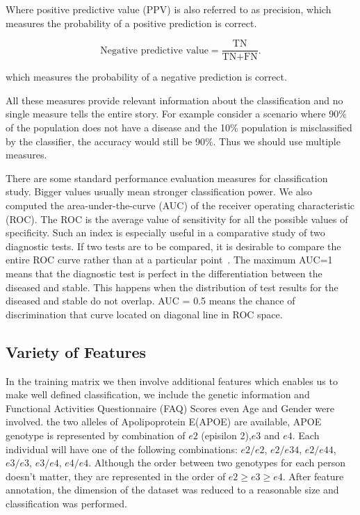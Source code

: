 \documentclass[authoryear,preprint,revi	ew,12pt]{elsarticle}
\begin{document}
Where positive predictive value (PPV) is also referred to as precision, which measures the probability of a positive prediction is correct.

\begin{equation*}
\textrm{Negative predictive value} = \frac{\textrm{TN}}{\textrm{TN} + \textrm{FN}}.
\end{equation*}

which measures the probability of a negative prediction is correct.

All these measures provide relevant information about the classification and no single measure tells the entire story. For example consider a scenario where 90\% of the population does not have a disease and the 10\% population is misclassified by the classifier, the accuracy would still be 90\%. Thus we should use multiple measures.   

There are some standard performance evaluation measures for classification study. Bigger values usually mean stronger classification power. We also computed the area-under-the-curve (AUC) of the receiver operating characteristic (ROC). The ROC is the average value of sensitivity for all the possible values of specificity. Such an index is especially useful in a comparative study of two diagnostic tests. If two tests are to be compared, it is desirable to compare the entire ROC curve rather than at a particular point~\citep{swets1979roc}. The maximum AUC=1 means that the diagnostic test is perfect in the differentiation between the diseased and stable. This happens when the distribution of test results for the diseased and stable do not overlap. AUC = 0.5 means the chance of discrimination that curve located on diagonal line in ROC space. 


\subsection{Variety of Features}
\label{subsection:feature_comp}
In the training matrix we then involve additional features which enables us to make well defined classification, we include the genetic information and Functional Activities Questionnaire (FAQ) Scores even Age and Gender were involved. the two alleles of Apolipoprotein E(APOE) are available, APOE genotype is represented by combination of $e2$ (episilon 2),$e3$ and $e4$. Each individual will have one of the following combinations: $e2/e2$, $e2/e34$, $e2/e44$, $e3/e3$, $e3/e4$, $e4/e4$. Although the order between two genotypes for each person doesn't matter, they are represented in the order of $e2 \ge e3 \ge e4$. After feature annotation, the dimension of the dataset was reduced to a reasonable size and classification was performed.
\end{document}
